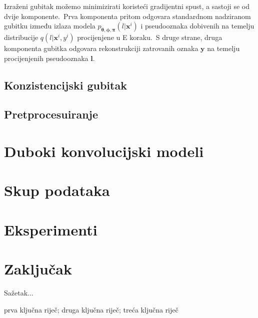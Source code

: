 \documentclass[diplomskirad]{fer}
\begin{document}
Izraženi gubitak možemo minimizirati koristeći gradijentni spust, a sastoji se od dvije komponente.\ 
Prva komponenta pritom odgovara standardnom nadziranom gubitku između izlaza modela $p_{\bm{\theta}, \bm{\phi}, \bm{\pi}}(l | \bm{x}^i)$ i pseudooznaka dobivenih na temelju distribucije $q(l | \bm{x}^i, y^i)$ procijenjene u E koraku.\ 
S druge strane, druga komponenta gubitka odgovara rekonstrukciji zatrovanih oznaka $\bm{y}$ na temelju procijenjenih pseudooznaka $\bm{l}$.\ 

\section{Konzistencijski gubitak}
\label{sek:con_loss}

\section{Pretprocesuiranje}
\label{sek:preproc}

\chapter{Duboki konvolucijski modeli}
\label{pog:cnn}

\chapter{Skup podataka}
\label{pog:skup}


\chapter{Eksperimenti}
\label{pog:eksperimenti}


\chapter{Zaključak}
\label{pog:zakljucak}







\begin{sazetak}
  Sažetak...
\end{sazetak}

\begin{kljucnerijeci}
  prva ključna riječ; druga ključna riječ; treća ključna riječ
\end{kljucnerijeci}
\end{document}
